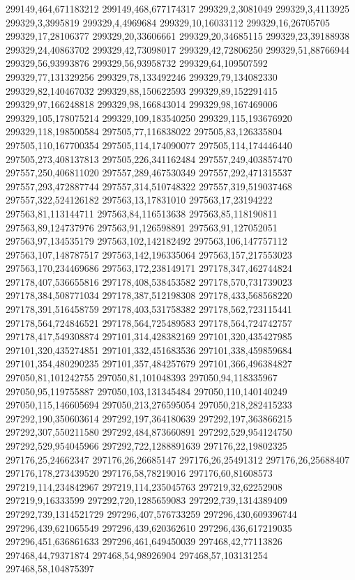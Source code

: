 299149,464,671183212
299149,468,677174317
299329,2,3081049
299329,3,4113925
299329,3,3995819
299329,4,4969684
299329,10,16033112
299329,16,26705705
299329,17,28106377
299329,20,33606661
299329,20,34685115
299329,23,39188938
299329,24,40863702
299329,42,73098017
299329,42,72806250
299329,51,88766944
299329,56,93993876
299329,56,93958732
299329,64,109507592
299329,77,131329256
299329,78,133492246
299329,79,134082330
299329,82,140467032
299329,88,150622593
299329,89,152291415
299329,97,166248818
299329,98,166843014
299329,98,167469006
299329,105,178075214
299329,109,183540250
299329,115,193676920
299329,118,198500584
297505,77,116838022
297505,83,126335804
297505,110,167700354
297505,114,174090077
297505,114,174446440
297505,273,408137813
297505,226,341162484
297557,249,403857470
297557,250,406811020
297557,289,467530349
297557,292,471315537
297557,293,472887744
297557,314,510748322
297557,319,519037468
297557,322,524126182
297563,13,17831010
297563,17,23194222
297563,81,113144711
297563,84,116513638
297563,85,118190811
297563,89,124737976
297563,91,126598891
297563,91,127052051
297563,97,134535179
297563,102,142182492
297563,106,147757112
297563,107,148787517
297563,142,196335064
297563,157,217553023
297563,170,234469686
297563,172,238149171
297178,347,462744824
297178,407,536655816
297178,408,538453582
297178,570,731739023
297178,384,508771034
297178,387,512198308
297178,433,568568220
297178,391,516458759
297178,403,531758382
297178,562,723115441
297178,564,724846521
297178,564,725489583
297178,564,724742757
297178,417,549308874
297101,314,428382169
297101,320,435427985
297101,320,435274851
297101,332,451683536
297101,338,459859684
297101,354,480290235
297101,357,484257679
297101,366,496384827
297050,81,101242755
297050,81,101048393
297050,94,118335967
297050,95,119755887
297050,103,131345484
297050,110,140140249
297050,115,146605694
297050,213,276595054
297050,218,282415233
297292,190,350603614
297292,197,364180639
297292,197,363866215
297292,307,550211580
297292,484,873660891
297292,529,954124750
297292,529,954045966
297292,722,1288891639
297176,22,19802325
297176,25,24662347
297176,26,26685147
297176,26,25491312
297176,26,25688407
297176,178,273439520
297176,58,78219016
297176,60,81608573
297219,114,234842967
297219,114,235045763
297219,32,62252908
297219,9,16333599
297292,720,1285659083
297292,739,1314389409
297292,739,1314521729
297296,407,576733259
297296,430,609396744
297296,439,621065549
297296,439,620362610
297296,436,617219035
297296,451,636861633
297296,461,649450039
297468,42,77113826
297468,44,79371874
297468,54,98926904
297468,57,103131254
297468,58,104875397
